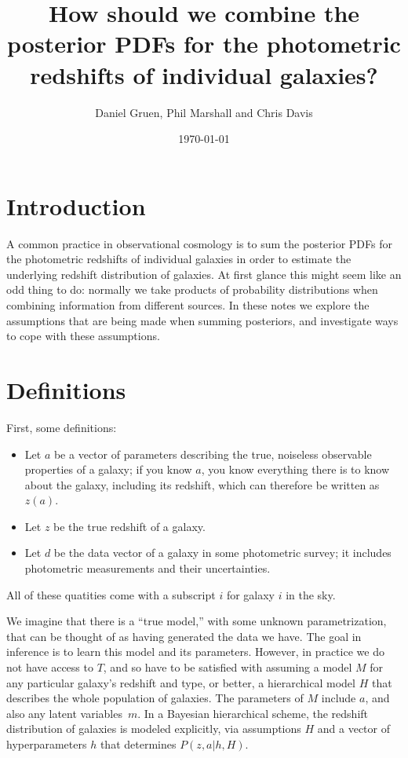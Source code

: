 \documentclass[11pt]{amsart}
\title{How should we combine the posterior PDFs for the photometric redshifts of individual galaxies?}
\author{Daniel Gruen, Phil Marshall and Chris Davis}
\date{\today}
\begin{document}
\maketitle

\section{Introduction}

A common practice in observational cosmology is to sum the posterior
PDFs for the photometric redshifts of individual galaxies in order to
estimate the underlying redshift distribution of galaxies.  At first
glance this might seem like an odd thing to do: normally we take
products of probability distributions when combining information from
different sources. In these notes we explore the assumptions that are
being made when summing posteriors, and investigate ways to cope with
these assumptions.

\section{Definitions}

First, some definitions:
\begin{itemize}
\item Let $a$ be a vector of parameters describing the true, noiseless
observable properties of a galaxy; if you know $a$, you know everything
there is to know about the galaxy, including its redshift, which can therefore be written as $z(a)$.
\item Let $z$ be the true redshift of a galaxy.
\item Let $d$ be the data vector of a galaxy in some photometric survey;
it includes photometric measurements and their uncertainties.
\end{itemize}
All of these quatities come with a subscript $i$ for galaxy $i$ in the sky.

We imagine that there is a ``true model,'' with some unknown
parametrization, that can be thought of as having generated the data we
have. The goal in inference is to learn this model and its parameters.
However, in practice we do not have access to $T$, and so have to be
satisfied with assuming a model $M$ for any particular galaxy's redshift
and type, or better, a hierarchical model $H$ that describes the whole
population of galaxies. The parameters of $M$ include $a$, and also any
latent variables~$m$.  In a Bayesian hierarchical scheme, the redshift
distribution of galaxies is modeled explicitly, via assumptions $H$ and
a vector of hyperparameters $h$ that determines $P(z,a|h,H)$.
\end{document}
